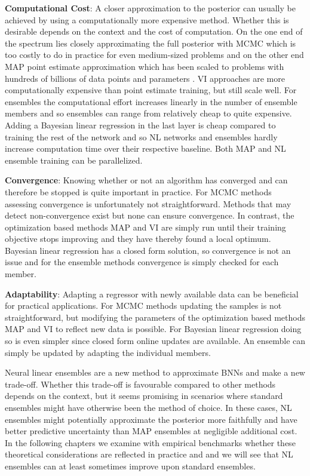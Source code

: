 \documentclass[../thesis.tex]{subfiles}
\begin{document}
\noindent \textbf{Computational Cost}: 
A closer approximation to the posterior can usually be achieved by using a computationally more expensive method. Whether this is desirable depends on the context and the cost of computation. On the one end of the spectrum lies closely approximating the full posterior with MCMC which is too costly to do in practice for even medium-sized problems and on the other end MAP point estimate approximation which has been scaled to problems with hundreds of billions of data points and parameters \parencite{brown2020language}. VI approaches are more computationally expensive than point estimate training, but still scale well. For ensembles the computational effort increases linearly in the number of ensemble members and so ensembles can range from relatively cheap to quite expensive. Adding a Bayesian linear regression in the last layer is cheap compared to training the rest of the network and so NL networks and ensembles hardly increase computation time over their respective baseline. Both MAP and NL ensemble training can be parallelized.
\medskip

\noindent \textbf{Convergence}:
Knowing whether or not an algorithm has converged and can therefore be stopped is quite important in practice. For MCMC methods assessing convergence is unfortunately not straightforward. Methods that may detect non-convergence exist but none can ensure convergence. In contrast, the optimization based methods MAP and VI are simply run until their training objective stops improving and they have thereby found a local optimum. Bayesian linear regression has a closed form solution, so convergence is not an issue and for the ensemble methods convergence is simply checked for each member.
\medskip

\noindent \textbf{Adaptability}:
Adapting a regressor with newly available data can be beneficial for practical applications. For MCMC methods updating the samples is not straightforward, but modifying the parameters of the optimization based methods MAP and VI to reflect new data is possible. For Bayesian linear regression doing so is even simpler since closed form online updates are available. An ensemble can simply be updated by adapting the individual members.
\medskip


Neural linear ensembles are a new method to approximate BNNs and make a new trade-off. Whether this trade-off is favourable compared to other methods depends on the context, but it seems promising in scenarios where standard ensembles might have otherwise been the method of choice. In these cases, NL ensembles might potentially approximate the posterior more faithfully and have better predictive uncertainty than MAP ensembles at negligible additional cost. In the following chapters we examine with empirical benchmarks whether these theoretical considerations are reflected in practice and and we will see that NL ensembles can at least sometimes improve upon standard ensembles.
\end{document}
